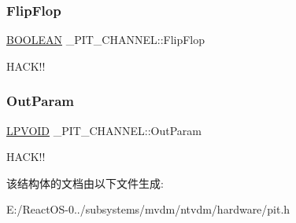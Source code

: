 \subsubsection{\texorpdfstring{Flip\+Flop}{FlipFlop}}
{\footnotesize\ttfamily \hyperlink{_processor_bind_8h_a112e3146cb38b6ee95e64d85842e380a}{B\+O\+O\+L\+E\+AN} \+\_\+\+P\+I\+T\+\_\+\+C\+H\+A\+N\+N\+E\+L\+::\+Flip\+Flop}

H\+A\+C\+K!! \mbox{\label{struct___p_i_t___c_h_a_n_n_e_l_ad0057c56996469933a0d5949d0f39442}} 
\subsubsection{\texorpdfstring{Out\+Param}{OutParam}}
{\footnotesize\ttfamily \hyperlink{interfacevoid}{L\+P\+V\+O\+ID} \+\_\+\+P\+I\+T\+\_\+\+C\+H\+A\+N\+N\+E\+L\+::\+Out\+Param}

H\+A\+C\+K!! 

该结构体的文档由以下文件生成\+:\begin{DoxyCompactItemize}
\item 
E\+:/\+React\+O\+S-\/0../subsystems/mvdm/ntvdm/hardware/pit.\+h\end{DoxyCompactItemize}
